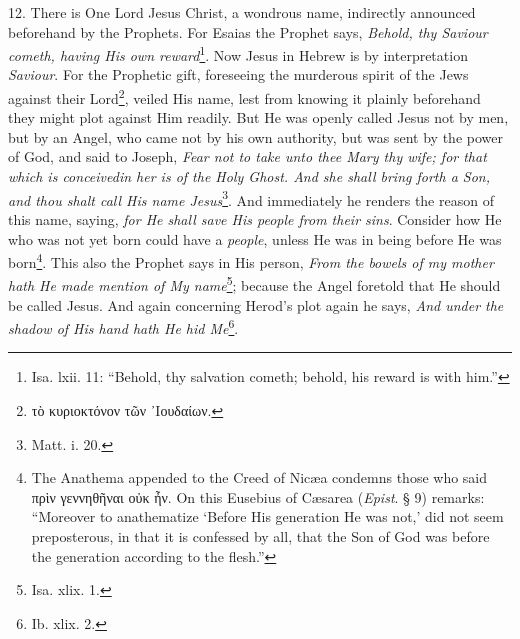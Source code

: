 12. There is One Lord Jesus Christ, a wondrous name, indirectly announced beforehand by the Prophets. For Esaias the Prophet says, \emph{Behold, thy Saviour cometh, having His own reward}\footnote{Isa. lxii. 11: “Behold, thy salvation cometh; behold, his reward is with him.”}. Now Jesus in Hebrew is by interpretation \emph{Saviour}. For the Prophetic gift, foreseeing the murderous spirit of the Jews against their Lord\footnote{\textgreek{τὸ κυριοκτόνον τῶν ᾽Ιουδαίων}.}, veiled His name, lest from knowing it plainly beforehand they might plot against Him readily. But He was openly called Jesus not by men, but by an Angel, who came not by his own authority, but was sent by the power of God, and said to Joseph, \emph{Fear not to take unto thee Mary thy wife; for that which is con}\emph{ceivedin her is of the Holy Ghost. And she shall bring forth a Son, and thou shalt call His name Jesus}\footnote{Matt. i. 20.}. And immediately he renders the reason of this name, saying, \emph{for He shall save His people from their sins}. Consider how He who was not yet born could have a \emph{people}, unless He was in being before He was born\footnote{The Anathema appended to the Creed of Nicæa condemns those who said \textgreek{πρὶν γεννηθῆναι οὐκ ἦν.} On this Eusebius of Cæsarea (\emph{Epist}. § 9) remarks: “Moreover to anathematize ‘Before His generation He was not,’ did not seem preposterous, in that it is confessed by all, that the Son of God was before the generation according to the flesh.”}. This also the Prophet says in His person, \emph{From the bowels of my mother hath He made mention of My name}\footnote{Isa. xlix. 1.}; because the Angel foretold that He should be called Jesus. And again concerning Herod’s plot again he says, \emph{And under the shadow of His hand hath He hid Me}\footnote{Ib. xlix. 2.}.

